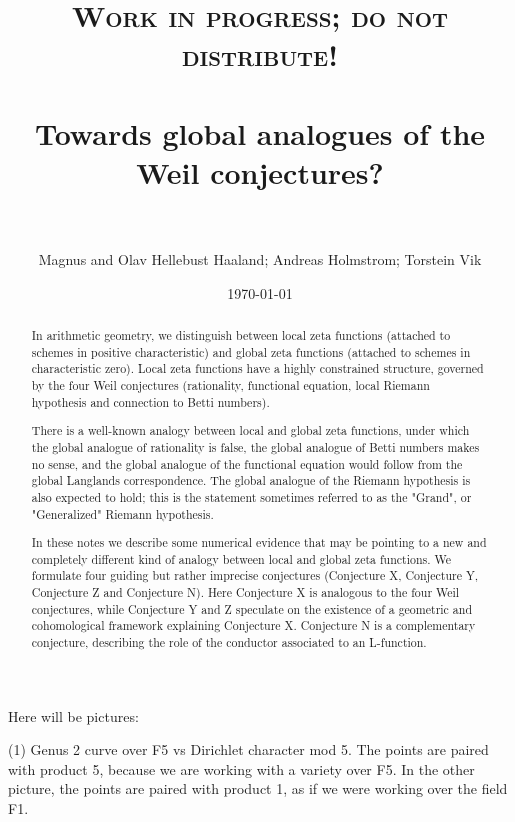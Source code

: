 \documentclass[paper=a4, fontsize=11pt]{scrartcl} %
\title{
\normalfont \normalsize
\textsc{Work in progress; do not distribute!} \\ [25pt] %
\horrule{0.5pt} \\[0.4cm] %
\LARGE Towards global analogues of the Weil conjectures? \\ %
\horrule{2pt} \\[0.5cm] %
}
\author{Magnus and Olav Hellebust Haaland; Andreas Holmstrom; Torstein Vik} %
\date{\normalsize\today} %
\numberwithin{equation}{section} %
\numberwithin{figure}{section} %
\numberwithin{table}{section} %
\begin{document}
\maketitle %


\begin{abstract}
In arithmetic geometry, we distinguish between local zeta functions (attached to schemes in positive characteristic) and global zeta functions (attached to schemes in characteristic zero). Local zeta functions have a highly constrained structure, governed by the four Weil conjectures (rationality, functional equation, local Riemann hypothesis and connection to Betti numbers).

There is a well-known analogy between local and global zeta functions, under which the global analogue of rationality is false, the global analogue of Betti numbers makes no sense, and the global analogue of the functional equation would follow from the global Langlands correspondence. The global analogue of the Riemann hypothesis is also expected to hold; this is the statement sometimes referred to as the "Grand", or "Generalized" Riemann hypothesis.

In these notes we describe some numerical evidence that may be pointing to a new and completely different kind of analogy between local and global zeta functions. We formulate four guiding but rather imprecise conjectures (Conjecture X, Conjecture Y, Conjecture Z and Conjecture N). Here Conjecture X is analogous to the four Weil conjectures, while Conjecture Y and Z speculate on the existence of a geometric and cohomological framework explaining Conjecture X. Conjecture N is a complementary conjecture, describing the role of the conductor associated to an L-function.


\end{abstract}


\newpage

Here will be pictures:

(1) Genus 2 curve over F5 vs Dirichlet character mod 5. The points are paired with product 5, because we are working with a variety over F5. In the other picture, the points are paired with product 1, as if we were working over the field F1.
\end{document}
